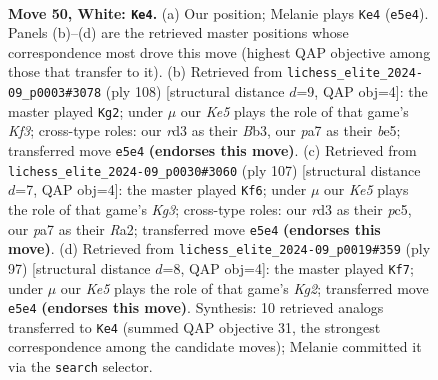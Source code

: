 \documentclass[11pt]{article}
\begin{document}
\clearpage

\begin{figure}[p]\centering
\begin{subfigure}{0.46\textwidth}\centering
\resizebox{\linewidth}{!}{%
\newchessgame
\chessboard[
  setfen={8/p2p4/2p4k/4KP2/8/3r4/8/8 w - - 1 50},
  showmover=false,
  pgfstyle=straightmove, color=movearrow, markmove={e5-e4}
]}
\caption{}
\end{subfigure}\hfill
\begin{subfigure}{0.46\textwidth}\centering
\resizebox{\linewidth}{!}{%
\newchessgame
\chessboard[
  setfen={8/4k3/8/4b1p1/6Pp/1B3K2/8/8 w - - 0 55},
  showmover=false,
  pgfstyle=straightmove, color=movearrow, markmove={f3-g2}
]}
\caption{}
\end{subfigure}
\\[4pt]
\begin{subfigure}{0.46\textwidth}\centering
\resizebox{\linewidth}{!}{%
\newchessgame
\chessboard[
  setfen={8/8/6k1/2P2p2/3K1P2/6P1/r7/8 b - - 0 54},
  showmover=false,
  pgfstyle=straightmove, color=movearrow, markmove={g6-f6}
]}
\caption{}
\end{subfigure}\hfill
\begin{subfigure}{0.46\textwidth}\centering
\resizebox{\linewidth}{!}{%
\newchessgame
\chessboard[
  setfen={4R3/6k1/3P3p/p3P2P/P7/8/8/6K1 b - - 1 49},
  showmover=false,
  pgfstyle=straightmove, color=movearrow, markmove={g7-f7}
]}
\caption{}
\end{subfigure}
\caption{\textbf{Move 50, White: \texttt{Ke4}.} (a) Our position; Melanie plays \texttt{Ke4} (\texttt{e5e4}). Panels (b)--(d) are the retrieved master positions whose correspondence most drove this move (highest QAP objective among those that transfer to it). (b) Retrieved from \texttt{lichess\_elite\_2024-09\_p0003\#3078} (ply 108) [structural distance $d$=9, QAP obj=4]: the master played \texttt{Kg2}; under $\mu$ our \emph{Ke5} plays the role of that game's \emph{Kf3}; cross-type roles: our \emph{r}d3 as their \emph{B}b3, our \emph{p}a7 as their \emph{b}e5; transferred move \texttt{e5e4} \textbf{(endorses this move)}. (c) Retrieved from \texttt{lichess\_elite\_2024-09\_p0030\#3060} (ply 107) [structural distance $d$=7, QAP obj=4]: the master played \texttt{Kf6}; under $\mu$ our \emph{Ke5} plays the role of that game's \emph{Kg3}; cross-type roles: our \emph{r}d3 as their \emph{p}c5, our \emph{p}a7 as their \emph{R}a2; transferred move \texttt{e5e4} \textbf{(endorses this move)}. (d) Retrieved from \texttt{lichess\_elite\_2024-09\_p0019\#359} (ply 97) [structural distance $d$=8, QAP obj=4]: the master played \texttt{Kf7}; under $\mu$ our \emph{Ke5} plays the role of that game's \emph{Kg2}; transferred move \texttt{e5e4} \textbf{(endorses this move)}. Synthesis: 10 retrieved analogs transferred to \texttt{Ke4} (summed QAP objective 31, the strongest correspondence among the candidate moves); Melanie committed it via the \texttt{search} selector.}
\label{fig:thought-m98}
\end{figure}
\end{document}
